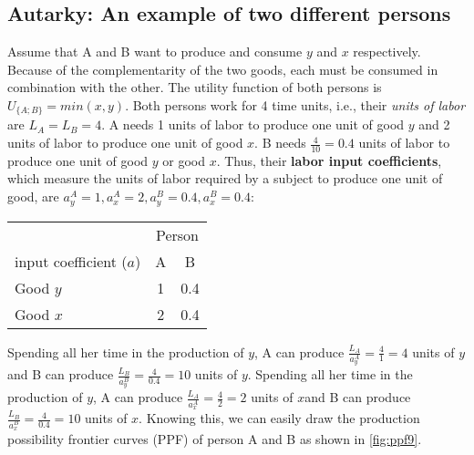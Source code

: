 	

	
	
	\subsection{Autarky: An example of two different persons}\label{sec:exampleAB}
	
Assume that A and B want to produce and consume $y$ and $x$ respectively. Because of the complementarity of the two goods, each must be consumed in combination with the other. The utility function of both persons is $U_{\{A;B\}}=min(x,y)$. Both persons work for 4 time units, i.e., their \textit{units of labor} are $L_A=L_B=4$. A needs 1 units of labor to produce one unit of good $y$ and 2 units of labor to produce one unit of good $x$. B needs $\frac{4}{10}=0.4$ units of labor to produce one unit of good $y$ or good $x$. Thus, their \textbf{labor input coefficients}, which measure the units of labor required by a subject to produce one unit of good, are $a^A_y=1, a^A_x=2, a^B_y=0.4, a^B_x=0.4$:
			\begin{center}
		\begin{tabular}{lcc}\toprule
			&\multicolumn{2}{c}{Person}\\\cmidrule{2-3}
		input coefficient ($a$)	&A &B\\		\midrule
			Good $y$ & 1 & 0.4 \\
			Good $x$ & 2 & 0.4 \\\bottomrule
		\end{tabular}
	\end{center}\medskip

Spending all her time in the production of $y$, A can produce  $\frac{L_A}{a_y^A}=\frac{4}{1}=4$ units of $y$ and B can produce $\frac{L_B}{a_y^B}=\frac{4}{0.4}=10$ units of $y$.
Spending all her time in the production of $y$, A can produce  $\frac{L_A}{a_x^A}=\frac{4}{2}=2$ units of $x$and B can produce $\frac{L_B}{a_x^B}=\frac{4}{0.4}=10$ units of $x$.    
Knowing this, we can easily draw the production possibility frontier curves (PPF) of person A and B as shown in \autoref{fig:ppf9}. 


